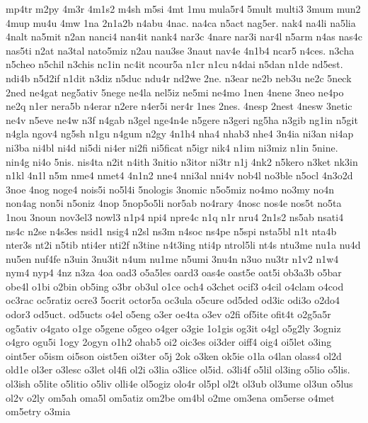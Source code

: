 {mp4tr 
m2py 
4m3r 
4m1s2 
m4sh 
m5si 
4mt 
1mu 
mula5r4 
5mult 
multi3 
3mum 
mun2 
4mup 
mu4u 
4mw 
1na 
2n1a2b 
n4abu 
4nac. 
na4ca 
n5act 
nag5er. 
nak4 
na4li 
na5lia 
4nalt 
na5mit 
n2an 
nanci4 
nan4it 
nank4 
nar3c 
4nare 
nar3i 
nar4l 
n5arm 
n4as 
nas4c 
nas5ti 
n2at 
na3tal 
nato5miz 
n2au 
nau3se 
3naut 
nav4e 
4n1b4 
ncar5 
n4ces. 
n3cha 
n5cheo 
n5chil 
n3chis 
nc1in 
nc4it 
ncour5a 
n1cr 
n1cu 
n4dai 
n5dan 
n1de 
nd5est. 
ndi4b 
n5d2if 
n1dit 
n3diz 
n5duc 
ndu4r 
nd2we 
2ne. 
n3ear 
ne2b 
neb3u 
ne2c 
5neck 
2ned 
ne4gat 
neg5ativ 
5nege 
ne4la 
nel5iz 
ne5mi 
ne4mo 
1nen 
4nene 
3neo 
ne4po 
ne2q 
n1er 
nera5b 
n4erar 
n2ere 
n4er5i 
ner4r 
1nes 
2nes. 
4nesp 
2nest 
4nesw 
3netic 
ne4v 
n5eve 
ne4w 
n3f 
n4gab 
n3gel 
nge4n4e 
n5gere 
n3geri 
ng5ha 
n3gib 
ng1in 
n5git 
n4gla 
ngov4 
ng5sh 
n1gu 
n4gum 
n2gy 
4n1h4 
nha4 
nhab3 
nhe4 
3n4ia 
ni3an 
ni4ap 
ni3ba 
ni4bl 
ni4d 
ni5di 
ni4er 
ni2fi 
ni5ficat 
n5igr 
nik4 
n1im 
ni3miz 
n1in 
5nine. 
nin4g 
ni4o 
5nis. 
nis4ta 
n2it 
n4ith 
3nitio 
n3itor 
ni3tr 
n1j 
4nk2 
n5kero 
n3ket 
nk3in 
n1kl 
4n1l 
n5m 
nme4 
nmet4 
4n1n2 
nne4 
nni3al 
nni4v 
nob4l 
no3ble 
n5ocl 
4n3o2d 
3noe 
4nog 
noge4 
nois5i 
no5l4i 
5nologis 
3nomic 
n5o5miz 
no4mo 
no3my 
no4n 
non4ag 
non5i 
n5oniz 
4nop 
5nop5o5li 
nor5ab 
no4rary 
4nosc 
nos4e 
nos5t 
no5ta 
1nou 
3noun 
nov3el3 
nowl3 
n1p4 
npi4 
npre4c 
n1q 
n1r 
nru4 
2n1s2 
ns5ab 
nsati4 
ns4c 
n2se 
n4s3es 
nsid1 
nsig4 
n2sl 
ns3m 
n4soc 
ns4pe 
n5spi 
nsta5bl 
n1t 
nta4b 
nter3s 
nt2i 
n5tib 
nti4er 
nti2f 
n3tine 
n4t3ing 
nti4p 
ntrol5li 
nt4s 
ntu3me 
nu1a 
nu4d 
nu5en 
nuf4fe 
n3uin 
3nu3it 
n4um 
nu1me 
n5umi 
3nu4n 
n3uo 
nu3tr 
n1v2 
n1w4 
nym4 
nyp4 
4nz 
n3za 
4oa 
oad3 
o5a5les 
oard3 
oas4e 
oast5e 
oat5i 
ob3a3b 
o5bar 
obe4l 
o1bi 
o2bin 
ob5ing 
o3br 
ob3ul 
o1ce 
och4 
o3chet 
ocif3 
o4cil 
o4clam 
o4cod 
oc3rac 
oc5ratiz 
ocre3 
5ocrit 
octor5a 
oc3ula 
o5cure 
od5ded 
od3ic 
odi3o 
o2do4 
odor3 
od5uct. 
od5ucts 
o4el 
o5eng 
o3er 
oe4ta 
o3ev 
o2fi 
of5ite 
ofit4t 
o2g5a5r 
og5ativ 
o4gato 
o1ge 
o5gene 
o5geo 
o4ger 
o3gie 
1o1gis 
og3it 
o4gl 
o5g2ly 
3ogniz 
o4gro 
ogu5i 
1ogy 
2ogyn 
o1h2 
ohab5 
oi2 
oic3es 
oi3der 
oiff4 
oig4 
oi5let 
o3ing 
oint5er 
o5ism 
oi5son 
oist5en 
oi3ter 
o5j 
2ok 
o3ken 
ok5ie 
o1la 
o4lan 
olass4 
ol2d 
old1e 
ol3er 
o3lesc 
o3let 
ol4fi 
ol2i 
o3lia 
o3lice 
ol5id. 
o3li4f 
o5lil 
ol3ing 
o5lio 
o5lis. 
ol3ish 
o5lite 
o5litio 
o5liv 
olli4e 
ol5ogiz 
olo4r 
ol5pl 
ol2t 
ol3ub 
ol3ume 
ol3un 
o5lus 
ol2v 
o2ly 
om5ah 
oma5l 
om5atiz 
om2be 
om4bl 
o2me 
om3ena 
om5erse 
o4met 
om5etry 
o3mia 
}
